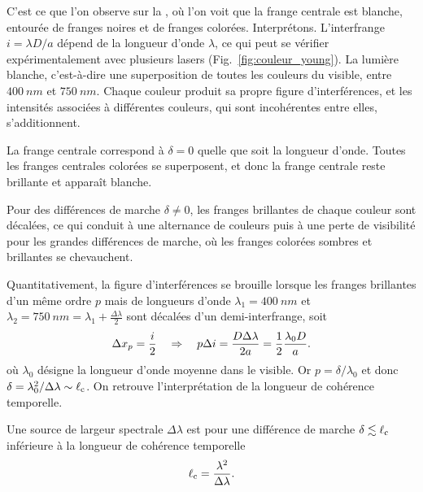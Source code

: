 \documentclass[12pt,fancy]{cours}
\begin{document}
C'est ce que l'on observe sur la , où l'on voit que la frange centrale est blanche, entourée de franges noires et de franges colorées. Interprétons. L'interfrange $i = \lambda D/a$ dépend de la longueur d'onde $\lambda$, ce qui peut se vérifier expérimentalement avec plusieurs lasers (Fig.~\ref{fig:couleur_young}). La lumière blanche, c’est-à-dire une superposition de toutes les couleurs du visible, entre $\SI{400}{nm}$ et $\SI{750}{nm}$. Chaque couleur produit sa propre figure d’interférences, et les intensités associées à différentes couleurs, qui sont incohérentes entre elles, s’additionnent.
\begin{liste}
  \item La frange centrale correspond à $\delta=0$ quelle que soit la longueur d’onde. Toutes les franges centrales colorées se superposent, et donc la frange centrale reste brillante et apparaît blanche.
  \item Pour des différences de marche $\delta \neq 0$, les franges brillantes de chaque couleur sont décalées, ce qui conduit à une alternance de couleurs puis à une perte de visibilité pour les grandes différences de marche, où les franges colorées sombres et brillantes se chevauchent.
\end{liste}
Quantitativement, la figure d'interférences se brouille lorsque les franges brillantes d'un même ordre $p$ mais de longueurs d'onde $\lambda_1 = \SI{400}{nm}$ et $\lambda_2 = \SI{750}{nm}  =\lambda_1 + \frac{\Delta \lambda}{2}$ sont décalées d'un demi-interfrange, soit
\begin{equation}
  \Delta x_p = \frac{i}{2} \quad \Rightarrow \quad p \Delta i = \frac{D \Delta \lambda}{2 a} = \frac{1}{2} \frac{\lambda_0 D}{a}.
\end{equation}
où $\lambda_0$ désigne la longueur d'onde moyenne dans le visible.
Or $p=\delta/\lambda_0$ et donc $\delta = \lambda_0^2/\Delta\lambda \sim \ell_{\rm c}$. On retrouve l'interprétation de la longueur de cohérence temporelle.

\begin{prop}\label{prop:}
Une source de largeur spectrale $\Delta \lambda$ est  pour une différence de marche $\delta \lesssim \ell_{\rm c}$ inférieure à la longueur de cohérence temporelle
$$
\ell_{\rm c} = \frac{\lambda^2}{\Delta \lambda}.
$$
\end{prop}
\end{document}
